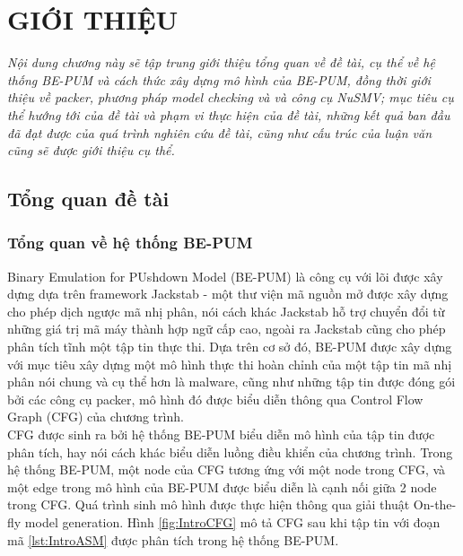
\newpage
{}

\chapter{GIỚI THIỆU}

\begin{concept}[15cm]
\textit{Nội dung chương này sẽ tập trung giới thiệu tổng quan về đề tài, cụ thể về hệ thống BE-PUM và cách thức xây dựng mô hình của BE-PUM, đồng thời giới thiệu về packer, phương pháp model checking và và công cụ NuSMV; mục tiêu cụ thể hướng tới của đề tài và phạm vi thực hiện của đề tài, những kết quả ban đầu đã đạt được của quá trình nghiên cứu đề tài, cũng như cấu trúc của luận văn cũng sẽ được giới thiệu cụ thể.}
\end{concept}

\section{Tổng quan đề tài}

\subsection{Tổng quan về hệ thống BE-PUM}

\hspace{0.5cm}Binary Emulation for PUshdown Model (BE-PUM) là công cụ với lõi được xây dựng dựa trên framework Jackstab - một thư viện mã nguồn mở được xây dựng cho phép dịch ngược mã nhị phân, nói cách khác Jackstab hỗ trợ chuyển đổi từ những giá trị mã máy thành hợp ngữ cấp cao, ngoài ra Jackstab cũng cho phép phân tích tĩnh một tập tin thực thi. Dựa trên cơ sở đó, BE-PUM được xây dựng với mục tiêu xây dựng một mô hình thực thi hoàn chỉnh của một tập tin mã nhị phân nói chung và cụ thể hơn là malware, cũng như những tập tin được đóng gói bởi các công cụ packer, mô hình đó được biểu diễn thông qua Control Flow Graph (CFG) của chương trình.\\ 

\hspace{0.5cm}CFG được sinh ra bởi hệ thống BE-PUM biểu diễn mô hình của tập tin được phân tích, hay nói cách khác biểu diễn luồng điều khiển của chương trình. Trong hệ thống BE-PUM, một node của CFG tương ứng với một node trong CFG, và một edge trong mô hình của BE-PUM được biểu diễn là cạnh nối giữa 2 node trong CFG. Quá trình sinh mô hình được thực hiện thông qua giải thuật On-the-fly model generation. Hình \ref {fig:IntroCFG} mô tả CFG sau khi tập tin với đoạn mã \ref {lst:IntroASM} được phân tích trong hệ thống BE-PUM.

